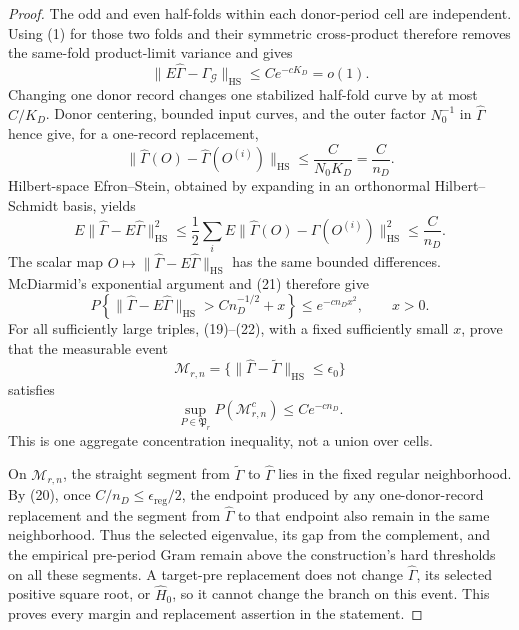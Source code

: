 \documentclass{article}
\begin{document}
\begin{proof}
The odd and even half-folds within each donor-period cell are independent.
Using (1) for those two folds and their symmetric cross-product therefore
removes the same-fold product-limit variance and gives
\[
 \|E\widehat\Gamma-\Gamma_{\mathcal G}\|_{\mathrm{HS}}
 \leq Ce^{-cK_D}=o(1).                                 \tag{19}
\]
Changing one donor record changes one stabilized half-fold curve by at most
\(C/K_D\).  Donor centering, bounded input curves, and the outer factor
\(N_0^{-1}\) in \(\widehat\Gamma\) hence give, for a one-record replacement,
\[
 \|\widehat\Gamma(O)-\widehat\Gamma(O^{(i)})\|_{\mathrm{HS}}
 \leq\frac{C}{N_0K_D}=\frac{C}{n_D}.                  \tag{20}
\]
Hilbert-space Efron--Stein, obtained by expanding in an orthonormal
Hilbert--Schmidt basis, yields
\[
 E\|\widehat\Gamma-E\widehat\Gamma\|_{\mathrm{HS}}^2
 \leq\frac12\sum_iE
 \|\widehat\Gamma(O)-\widehat\Gamma(O^{(i)})\|_{\mathrm{HS}}^2
 \leq\frac{C}{n_D}.                                   \tag{21}
\]
The scalar map
\(O\mapsto\|\widehat\Gamma-E\widehat\Gamma\|_{\mathrm{HS}}\)
has the same bounded differences.  McDiarmid's exponential argument and
(21) therefore give
\[
 P\left\{\|\widehat\Gamma-E\widehat\Gamma\|_{\mathrm{HS}}
 >Cn_D^{-1/2}+x\right\}\leq e^{-cn_Dx^2},
 \qquad x>0.                                           \tag{22}
\]
For all sufficiently large triples, (19)--(22), with a fixed sufficiently
small \(x\), prove that the measurable event
\[
 \mathcal M_{r,n}
 =\{\|\widehat\Gamma-\widetilde\Gamma\|_{\mathrm{HS}}
       \leq\epsilon_0\}                                \tag{23}
\]
satisfies
\[
 \sup_{P\in\mathfrak P_r}P(\mathcal M_{r,n}^c)
 \leq Ce^{-cn_D}.                                      \tag{24}
\]
This is one aggregate concentration inequality, not a union over cells.

On \(\mathcal M_{r,n}\), the straight segment from
\(\widetilde\Gamma\) to \(\widehat\Gamma\) lies in the fixed regular
neighborhood.  By (20), once \(C/n_D\leq\epsilon_{\mathrm{reg}}/2\), the
endpoint produced by any one-donor-record replacement and the segment from
\(\widehat\Gamma\) to that endpoint also remain in the same neighborhood.
Thus the selected eigenvalue, its gap from the complement, and the empirical
pre-period Gram remain above the construction's hard thresholds on all these
segments.  A target-pre replacement does not change \(\widehat\Gamma\), its
selected positive square root, or \(\widehat H_0\), so it cannot change the
branch on this event.  This proves every margin and replacement assertion in
the statement.


\end{proof}
\end{document}
